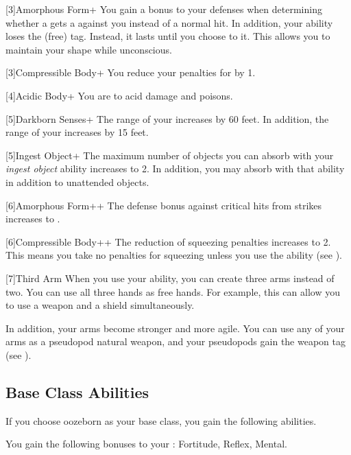         [3]{Amorphous Form+} You gain a  bonus to your defenses when determining whether a  gets a  against you instead of a normal hit.
        In addition, your  ability loses the  (free) tag.
        Instead, it lasts until you choose to  it.
        This allows you to maintain your shape while unconscious.

        [3]{Compressible Body+} You reduce your penalties for \squeezing by 1.

        [4]{Acidic Body+} You are  to acid damage and poisons.

        [5]{Darkborn Senses+} The range of your  increases by 60 feet.
        In addition, the range of your  increases by 15 feet.

        [5]{Ingest Object+} The maximum number of objects you can absorb with your \textit{ingest object} ability increases to 2.
        In addition, you may absorb  with that ability in addition to unattended objects.

        [6]{Amorphous Form++} The defense bonus against critical hits from strikes increases to .

        [6]{Compressible Body++} The reduction of squeezing penalties increases to 2.
        This means you take no penalties for squeezing unless you use the  ability (see ).

        [7]{Third Arm} When you use your  ability, you can create three arms instead of two.
        You can use all three hands as free hands.
        For example, this can allow you to use a  weapon and a shield simultaneously.

        In addition, your arms become stronger and more agile.
        You can use any of your arms as a pseudopod natural weapon, and your pseudopods gain the  weapon tag (see ).

    \subsection{Base Class Abilities}
        If you choose oozeborn as your base class, you gain the following abilities.

        You gain the following bonuses to your :  Fortitude,  Reflex,  Mental.

